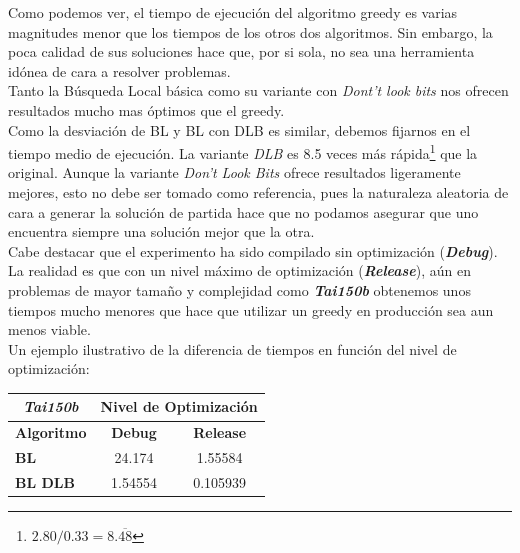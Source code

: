 \documentclass[a4paper, 12pt]{article}
\begin{document}
      Como podemos ver, el tiempo de ejecución del algoritmo greedy es varias magnitudes menor que los tiempos de los otros dos algoritmos. Sin embargo, la poca calidad de sus soluciones hace que, por si sola, no sea una herramienta idónea de cara a resolver problemas.\\
      
      Tanto la Búsqueda Local básica como su variante con \textit{Dont't look bits} nos ofrecen resultados mucho mas óptimos que el greedy. \\
      
      Como la desviación de BL y BL con DLB es similar, debemos fijarnos en el tiempo medio de ejecución. La variante \textit{DLB} es 8.5 veces más rápida\footnote{$2.80/0.33 = 8.\overline{48}$} que la original. Aunque la variante \textit{Don't Look Bits} ofrece resultados ligeramente mejores, esto no debe ser tomado como referencia, pues la naturaleza aleatoria de cara a generar la solución de partida hace que no podamos asegurar que uno encuentra siempre una solución mejor que la otra.\\
      
      Cabe destacar que el experimento ha sido compilado sin optimización (\textbf{\textit{Debug}}). La realidad es que con un nivel máximo de optimización (\textbf{\textit{Release}}), aún en problemas de mayor tamaño y complejidad como \textbf{\textit{Tai150b}} obtenemos unos tiempos mucho menores que hace que utilizar un greedy en producción sea aun menos viable.\\
      
      Un ejemplo ilustrativo de la diferencia de tiempos en función del nivel de optimización:
      
\begin{table}[H]
\centering
\label{my-label}
\begin{tabular}{l|c|c|}
\cline{2-3}
\multicolumn{1}{c|}{{\textit{Tai150b}}} & \multicolumn{2}{c|}{\textbf{Nivel de Optimización}} \\ \hline
\multicolumn{1}{|c|}{\textbf{Algoritmo}}    & \textbf{Debug}          & \textbf{Release}          \\ \hline
\multicolumn{1}{|l|}{\textbf{BL}}           & 24.174                  & 1.55584                   \\ \hline
\multicolumn{1}{|l|}{\textbf{BL DLB}}       & 1.54554                 & 0.105939                  \\ \hline
\end{tabular}
\end{table}
\end{document}
